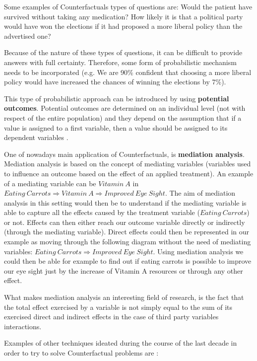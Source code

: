 Some examples of Counterfactuals types of questions are: Would the patient have survived without taking any medication? How likely it is that a political party would have won the elections if it had proposed a more liberal policy than the advertised one? 

Because of the nature of these types of questions, it can be difficult to provide answers with full certainty. Therefore, some form of probabilistic mechanism needs to be incorporated (e.g. We are 90\% confident that choosing a more liberal policy would have increased the chances of winning the elections by 7\%).

This type of probabilistic approach can be introduced by using \textbf{potential outcomes}. Potential outcomes are determined on an individual level (not with respect of the entire population) and they depend on the assumption that if a value is assigned to a first variable, then a value should be assigned to its dependent variables \cite{why}.

One of nowadays main application of Counterfactuals, is \textbf{mediation analysis}. Mediation analysis is based on the concept of mediating variables (variables used to influence an outcome based on the effect of an applied treatment). An example of a mediating variable can be $Vitamin\:A$ in $Eating\:Carrots \Rightarrow Vitamin\:A \Rightarrow Improved\:Eye\:Sight$. The aim of mediation analysis in this setting would then be to understand if the mediating variable is able to capture all the effects caused by the treatment variable ($Eating\:Carrots$) or not. Effects can then either reach our outcome variable directly or indirectly (through the mediating variable). Direct effects could then be represented in our example as moving through the following diagram without the need of mediating variables: $Eating\:Carrots \Rightarrow Improved\:Eye\:Sight$. Using mediation analysis we could then be able for example to find out if eating carrots is possible to improve our eye sight just by the increase of Vitamin A resources or through any other effect.

What makes mediation analysis an interesting field of research, is the fact that the total effect exercised by a variable is not simply equal to the sum of its exercised direct and indirect effects in the case of third party variables interactions.

Examples of other techniques ideated during the course of the last decade in order to try to solve Counterfactual problems are \cite{eva}:

